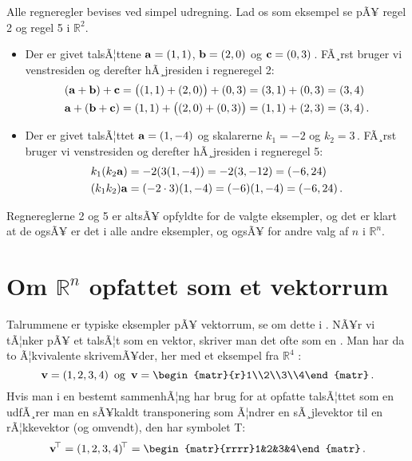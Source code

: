 \begin{bevis}
Alle regneregler bevises ved simpel udregning. Lad os som eksempel se pÃ¥ regel 2 og regel 5 i $\mathbb R ^2$.
\begin{itemize}
\item
Der er givet talsÃ¦ttene $\mathbf{a}=(1,1)$, $\mathbf{b}=(2,0)$ og $\mathbf{c}=(0,3)\,$. FÃ¸rst bruger vi venstresiden og derefter hÃ¸jresiden i regneregel 2:
\begin{align*}
(\mathbf{a} + \mathbf{b}) + \mathbf{c}&=\big((1,1)+(2,0)\big)+(0,3)=(3,1)+(0,3)=(3,4)\\
\mathbf{a} + (\mathbf{b} + \mathbf{c})&=(1,1)+\big((2,0)+(0,3)\big)=(1,1)+(2,3)=(3,4)\,.
\end{align*}
\item
Der er givet talsÃ¦ttet $\mathbf{a}=(1,-4)$ og skalarerne $k_1 = -2$ og $k_2 = 3\,$. FÃ¸rst bruger vi venstresiden og derefter hÃ¸jresiden i regneregel 5:
\begin{align*}
k_1(k_2\mathbf{a})&= -2(3(1,-4))=-2(3,-12)=(-6,24)\\
(k_1k_2)\mathbf{a}&=(-2\cdot 3)(1,-4)=(-6)(1,-4)=(-6,24)\,.
\end{align*}
\end{itemize}
Regnereglerne 2 og 5 er altsÃ¥ opfyldte for de valgte eksempler, og det er klart at de ogsÃ¥ er det i alle andre eksempler, og ogsÃ¥ for andre valg af $n$ i $\mathbb R ^n$.
\end{bevis}

\section{Om $\mathbb R^n $ opfattet som et vektorrum}
Talrummene er typiske eksempler pÃ¥ vektorrum, se om dette i . NÃ¥r vi tÃ¦nker pÃ¥ et talsÃ¦t som en vektor, skriver man det ofte som en . Man har da to Ã¦kvivalente skrivemÃ¥der, her med et eksempel fra $\mathbb R^4$ :
$$\mv=(1,2,3,4)\,\,\,\mathrm{og}\,\,\,
\mv=\begin{matr}{r}1\\2\\3\\4\end{matr}\,.$$
Hvis man i en bestemt sammenhÃ¦ng har brug for at opfatte talsÃ¦ttet som en  udfÃ¸rer man en sÃ¥kaldt transponering som Ã¦ndrer en sÃ¸jlevektor til en rÃ¦kkevektor (og omvendt), den har symbolet T:
$$\mv\transp =(1,2,3,4)\transp=
\begin{matr}{rrrr}1&2&3&4\end{matr}\,.$$







 